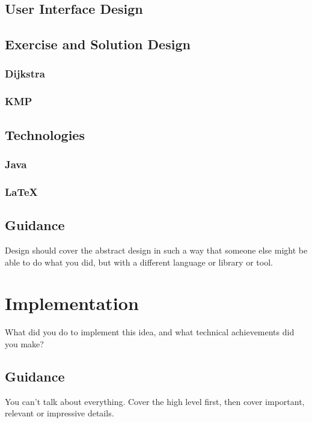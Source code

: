 \documentclass{l4proj}
\begin{document}
\section{User Interface Design}

\section{Exercise and Solution Design}

\subsection{Dijkstra}
\subsection{KMP}

\section{Technologies}

\subsection{Java}
\subsection{LaTeX}

\section{Guidance}
Design should cover the abstract design in such a way that someone else might be able to do what you did, but with a different language or library or tool.

\chapter{Implementation}
\label{chap:imp}
What did you do to implement this idea, and what technical achievements did you make?
\section{Guidance}
You can't talk about everything. Cover the high level first, then cover important, relevant or impressive details.
\end{document}
